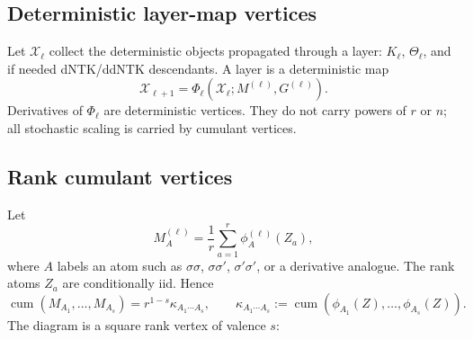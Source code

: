 \documentclass[11pt]{article}
\newcommand{\cum}{\operatorname{cum}}
\begin{document}
\begin{center}
\end{center}

\subsection{Deterministic layer-map vertices}

Let $\mathcal X_\ell$ collect the deterministic objects propagated through a layer: $K_\ell$, $\Theta_\ell$, and if needed dNTK/ddNTK descendants.  A layer is a deterministic map
\[
\mathcal X_{\ell+1}=\Phi_\ell(\mathcal X_\ell;M^{(\ell)},G^{(\ell)}).
\]
Derivatives of $\Phi_\ell$ are deterministic vertices.  They do not carry powers of $r$ or $n$; all stochastic scaling is carried by cumulant vertices.

\begin{center}
\end{center}

\subsection{Rank cumulant vertices}

Let
\begin{equation}
M_A^{(\ell)}=\frac1r\sum_{a=1}^r\phi_A^{(\ell)}(Z_a),
\label{eq:rank-state}
\end{equation}
where $A$ labels an atom such as $\sigma\sigma$, $\sigma\sigma'$, $\sigma'\sigma'$, or a derivative analogue.  The rank atoms $Z_a$ are conditionally iid.  Hence
\begin{equation}
\cum(M_{A_1},\ldots,M_{A_s})=r^{1-s}\kappa_{A_1\cdots A_s},
\qquad
\kappa_{A_1\cdots A_s}:=\cum(\phi_{A_1}(Z),\ldots,\phi_{A_s}(Z)).
\label{eq:rank-cumulant}
\end{equation}
The diagram is a square rank vertex of valence $s$:
\end{document}
